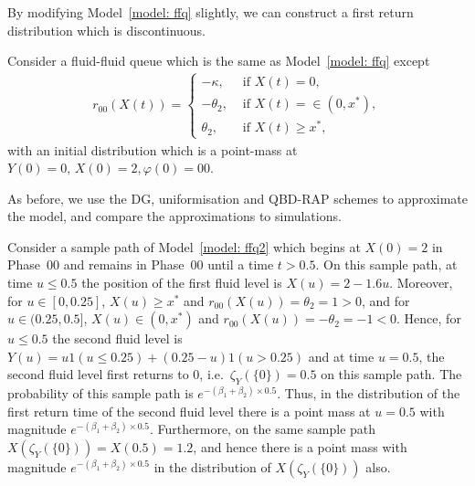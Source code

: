 By modifying Model~\ref{model: ffq} slightly, we can construct a first return distribution which is discontinuous. 
\begin{model}\label{model: ffq2}
	Consider a fluid-fluid queue which is the same as Model~\ref{model: ffq} except 
	\begin{align}
		r_{00}(X(t)) = \begin{cases}
			-\kappa, & \mbox{ if }X(t)=0,\\
			-\theta_2, & \mbox{ if }X(t)=\in(0,x^*),\\
			\theta_2, & \mbox{ if }X(t)\geq x^*,
		\end{cases}
	\end{align}
	with an initial distribution which is a point-mass at \(Y(0)=0,\, X(0)=2, \varphi(0)=00\). 
\end{model}
As before, we use the DG, uniformisation and QBD-RAP schemes to approximate the model, and compare the approximations to simulations. 

Consider a sample path of Model~\ref{model: ffq2} which begins at \(X(0)=2\) in Phase~\(00\) and remains in Phase~\(00\) until a time \(t>0.5\). On this sample path, at time \(u\leq 0.5\) the position of the first fluid level is \(X(u)=2-1.6u\). Moreover, for \(u\in[0,0.25]\), \(X(u)\geq x^*\) and \(r_{00}(X(u))=\theta_2=1>0\), and for \(u\in(0.25,0.5]\), \(X(u)\in(0,x^*)\) and \(r_{00}(X(u))=-\theta_2=-1<0\). Hence, for \(u\leq 0.5\) the second fluid level is \(Y(u)=u1(u\leq 0.25)+(0.25-u)1(u>0.25)\) and at time \(u=0.5\), the second fluid level first returns to \(0\), i.e.~\(\zeta_{Y}(\{0\})=0.5\) on this sample path. The probability of this sample path is \(e^{-(\beta_1+\beta_2)\times 0.5}\). Thus, in the distribution of the first return time of the second fluid level there is a point mass at \(u=0.5\) with magnitude \(e^{-(\beta_1+\beta_2)\times 0.5}\). Furthermore, on the same sample path \(X(\zeta_Y(\{0\}))=X(0.5)=1.2\), and hence there is a point mass with magnitude \(e^{-(\beta_1+\beta_2)\times 0.5}\) in the distribution of \(X(\zeta_Y(\{0\}))\) also. 


